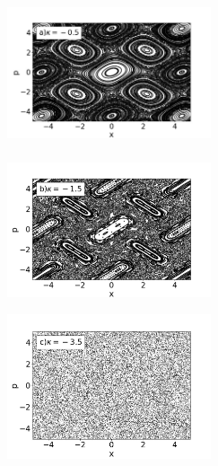 \documentclass[letterpaper,12pt,oneside]{book}
\begin{document}
\begin{figure}[h!]\label{EspaciosDeFase}
	
	\centering
	\begin{minipage}{0.32\textwidth}
		
		\includegraphics[width=6cm,height=4.5cm]{FigsJPG/PhaseSpace_a}
	\end{minipage}
	\begin{minipage}{0.32\textwidth}
		\includegraphics[width=6cm,height=4.5cm]{FigsJPG/PhaseSpace_b}
	\end{minipage}
	\begin{minipage}{0.32\textwidth}
		\includegraphics[width=6cm,height=4.5cm]{FigsJPG/PhaseSpace_c}
		
	\end{minipage}\\
	\begin{minipage}{0.32\textwidth}
		

\end{minipage}
\end{figure}
\end{document}
